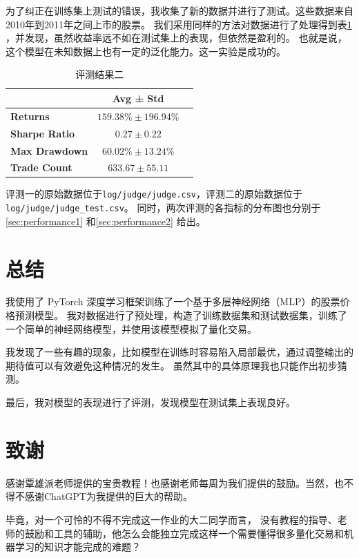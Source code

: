 \documentclass[final,5p,times,twocolumn,authoryear]{elsarticle}
\begin{document}
为了纠正在训练集上测试的错误，我收集了新的数据并进行了测试。这些数据来自2010年到2011年之间上市的股票。
我们采用同样的方法对数据进行了处理得到表\ref*{tab:performance2} ，并发现，虽然收益率远不如在测试集上的表现，但依然是盈利的。
也就是说，这个模型在未知数据上也有一定的泛化能力。这一实验是成功的。
\begin{table}[h!]
       \centering
       \begin{tabular}{@{}lcc@{}}
              \toprule
              \textbf{}             & \textbf{Avg ± Std}      \\ \midrule
              \textbf{Returns}      & $159.38\% \pm 196.94\%$ \\
              \textbf{Sharpe Ratio} & $0.27 \pm 0.22$         \\
              \textbf{Max Drawdown} & $60.02\%\pm 13.24\%$    \\
              \textbf{Trade Count}  & $633.67 \pm 55.11$      \\ \midrule
       \end{tabular}
       \caption{评测结果二}
       \label{tab:performance2}
\end{table}

评测一的原始数据位于\texttt{log/judge/judge.csv}，评测二的原始数据位于\texttt{log/judge/judge\_test.csv}。
同时，两次评测的各指标的分布图也分别于\ref{sec:performance1} 和\ref{sec:performance2} 给出。

\section{总结}
我使用了 PyTorch 深度学习框架训练了一个基于多层神经网络（MLP）的股票价格预测模型。
我对数据进行了预处理，构造了训练数据集和测试数据集，训练了一个简单的神经网络模型，并使用该模型模拟了量化交易。

我发现了一些有趣的现象，比如模型在训练时容易陷入局部最优，通过调整输出的期待值可以有效避免这种情况的发生。
虽然其中的具体原理我也只能作出初步猜测。

最后，我对模型的表现进行了评测，发现模型在测试集上表现良好。

\section*{致谢}
感谢覃雄派老师提供的宝贵教程！也感谢老师每周为我们提供的鼓励。当然，也不得不感谢ChatGPT为我提供的巨大的帮助。

毕竟，对一个可怜的不得不完成这一作业的大二同学而言，
没有教程的指导、老师的鼓励和工具的辅助，他怎么会能独立完成这样一个需要懂得很多量化交易和机器学习的知识才能完成的难题？
\end{document}
